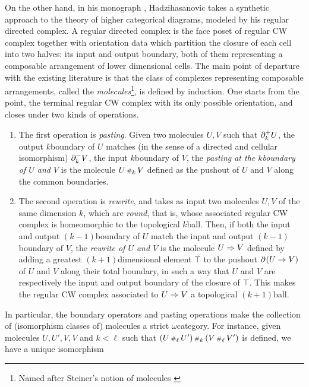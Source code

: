 On the other hand, in his monograph \cite{hadzihasanovic2024combinatorics}, Hadzihasanovic takes a synthetic approach to the theory of higher categorical diagrams, modeled by his regular directed complex.
A regular directed complex is the face poset of regular CW complex together with orientation data which partition the closure of each cell into two halves: its input and output boundary, both of them representing a composable arrangement of lower dimensional cells.
The main point of departure with the existing literature is that the class of complexes representing composable arrangements, called the \emph{molecules}\footnote{Named after Steiner's notion of molecules \cite{steiner1993algebra}}, is defined by induction.
One starts from the point, the terminal regular CW complex with its only possible orientation, and closes under two kinds of operations.
\begin{enumerate}
    \item The first operation is \emph{pasting}. Given two molecules \( U, V \) such that \( \partial_{k}^{+} U \), the output \( k \)\nbd boundary of \( U \) matches (in the sense of a directed and cellular isomorphism) \( \partial_{k}^{-} V \), the input \( k \)\nbd boundary of \( V \), the \emph{pasting at the \( k \)\nbd boundary of \( U \) and \( V \)} is the molecule \( U \,{\scriptstyle\#}_{k}\, V \) defined as the pushout of \( U \) and \( V \) along the common boundaries. 
    \item The second operation is \emph{rewrite}, and takes as input two molecules \( U, V \) of the same dimension \( k \), which are \emph{round}, that is, whose associated regular CW complex is homeomorphic to the topological \( k \)\nbd ball.
    Then, if both the input and output \( (k - 1) \)\nbd boundary of \( U \) match the input and output \( (k - 1) \)\nbd boundary of \( V \), the \emph{rewrite of \( U \) and \( V \)} is the molecule \( U \Rightarrow V \) defined by adding a greatest \( (k + 1) \)\nbd dimensional element \( \top \) to the pushout \( \partial_{}^{}(U \Rightarrow V) \) of \( U \) and \( V \) along their total boundary, in such a way that \( U \) and \( V \) are respectively the input and output boundary of the closure of \( \top \).
    This makes the regular CW complex associated to \( U \Rightarrow V \) a topological \( (k + 1) \)\nbd ball.
\end{enumerate}  
In particular, the boundary operators and pasting operations make the collection of (isomorphism classes of) molecules a strict \( \omega \)\nbd category.
For instance, given molecules \( U, U', V, V \) and \( k < \ell \) such that \( (U \,{\scriptstyle\#}_{\ell}\, U') \,{\scriptstyle\#}_{k}\, (V \,{\scriptstyle\#}_{\ell}\, V') \) is defined, we have a unique isomorphism
